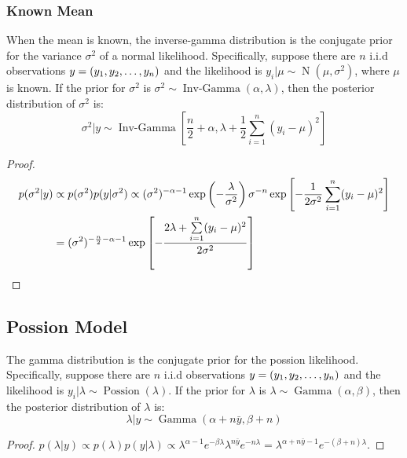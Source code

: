 \subsubsection{Known Mean}
\begin{theorem}
	When the mean is known, the inverse-gamma distribution is the conjugate prior for the variance $\sigma^2$ of a normal likelihood. Specifically, suppose there are $n$ i.i.d observations $y=(y_1, y_2, \dots, y_{n})$ and the likelihood is $y_i|\mu\sim\operatorname{N}(\mu,\sigma^2)$, where $\mu$ is known. If the prior for $\sigma^2$ is $\sigma^2\sim\operatorname{Inv-Gamma}(\alpha,\lambda)$, then the posterior distribution of $\sigma^2$ is:
	\begin{equation*}
		\sigma^2|y\sim\operatorname{Inv-Gamma}\left[\frac{n}{2}+\alpha,\lambda+\frac{1}{2}\sum_{i=1}^{n}(y_i-\mu)^2\right]
	\end{equation*}
\end{theorem}
\begin{proof}
	\begin{align*}
		p(\sigma^2|y)&\propto p(\sigma^2)p(y|\sigma^2)
		\propto(\sigma^2)^{-\alpha-1}\exp\left(-\frac{\lambda}{\sigma^2}\right)\sigma^{-n}\exp\left[-\frac{1}{2\sigma^2}\sum_{i=1}^{n}(y_i-\mu)^2\right] \\
		&=(\sigma^2)^{-\frac{n}{2}-\alpha-1}\exp\left[-\frac{2\lambda+\sum\limits_{i=1}^{n}(y_i-\mu)^2}{2\sigma^2}\right]\qedhere
	\end{align*}
\end{proof}
\subsection{Possion Model}
\begin{theorem}
	The gamma distribution is the conjugate prior for the possion likelihood. Specifically, suppose there are $n$ i.i.d observations $y=(y_1, y_2, \dots, y_{n})$ and the likelihood is $y_i|\lambda\sim\operatorname{Possion}(\lambda)$. If the prior for $\lambda$ is $\lambda\sim\operatorname{Gamma}(\alpha,\beta)$, then the posterior distribution of $\lambda$ is:
	\begin{equation*}
		\lambda|y\sim\operatorname{Gamma}\left(\alpha+n\bar{y},\beta+n\right)
	\end{equation*}
\end{theorem}
\begin{proof}
	$p(\lambda|y)\propto p(\lambda)p(y|\lambda)
	\propto\lambda^{\alpha-1}e^{-\beta\lambda}\lambda^{n\bar{y}}e^{-n\lambda}=\lambda^{\alpha+n\bar{y}-1}e^{-(\beta+n)\lambda}$.
\end{proof}

